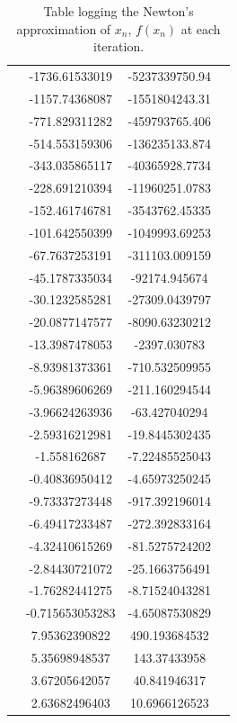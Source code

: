 \documentclass[a4paper,11pt]{article}
\begin{document}
\begin{center}
\begin{table}[h!]
\begin{tabular}{|c|c|c|c|}
			& -1736.61533019 & -5237339750.94 & \\
			& -1157.74368087 & -1551804243.31 & \\
			& -771.829311282 & -459793765.406 & \\
			& -514.553159306 & -136235133.874 & \\
			& -343.035865117 & -40365928.7734 & \\
			& -228.691210394 & -11960251.0783 & \\
			& -152.461746781 & -3543762.45335 & \\
			& -101.642550399 & -1049993.69253 & \\
			& -67.7637253191 & -311103.009159 & \\
			& -45.1787335034 & -92174.945674 & \\
			& -30.1232585281 & -27309.0439797 & \\
			& -20.0877147577 & -8090.63230212 & \\
			& -13.3987478053 & -2397.030783 & \\
			& -8.93981373361 & -710.532509955 & \\
			& -5.96389606269 & -211.160294544 & \\
			& -3.96624263936 & -63.427040294 & \\
			& -2.59316212981 & -19.8445302435 & \\
			& -1.558162687 & -7.22485525043 & \\
			& -0.40836950412 & -4.65973250245 & \\
			& -9.73337273448 & -917.392196014 & \\
			& -6.49417233487 & -272.392833164 & \\
			& -4.32410615269 & -81.5275724202 & \\
			& -2.84430721072 & -25.1663756491 & \\
			& -1.76282441275 & -8.71524043281 & \\
			& -0.715653053283 & -4.65087530829 & \\
			& 7.95362390822 & 490.193684532 & \\
			& 5.35698948537 & 143.37433958 & \\
			& 3.67205642057 & 40.841946317 & \\
			& 2.63682496403 & 10.6966126523 & \\
			\hline
			\end{tabular}
			\caption{ Table logging the Newton's approximation of $x_n$, $f(x_n)$ at each iteration. }
			\label{table:1}
		\end{table}
	\end{center}
	
\end{document}
